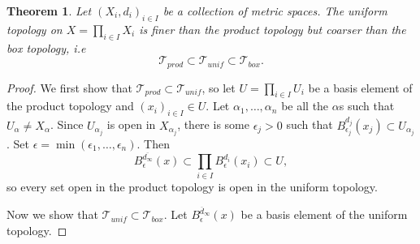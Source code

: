 \documentclass{report}
\newtheorem{theorem}{Theorem}[section]
\theoremstyle{definition}
\theoremstyle{remark}
\newcommand{\prt}[1]{\mathcal{#1}}
\newcommand{\ball}[3]{B_{#1}^{#3}(#2)}
\let\oldmin\min
\renewcommand{\min}[1]{\oldmin \left( #1 \right)}
\begin{document}
\begin{theorem} \label{thm_productUniformBoxCmp}
    Let $(X_i, d_i)_{i \in I}$ be a collection of metric spaces. The uniform topology on $X = \prod_{i \in I} X_i$ is finer than the product topology but coarser than the box topology, i.e
    \begin{equation*}
        \prt{T}_{prod} \subset \prt{T}_{unif} \subset \prt{T}_{box}.
    \end{equation*}
\end{theorem}

\begin{proof}
    We first show that $\prt{T}_{prod} \subset \prt{T}_{unif}$, so let $U=\prod_{i \in I} U_i$ be a basis element of the product topology and $(x_{i})_{i \in I} \in U$. Let $\alpha_1, \dots, \alpha_n$ be all the $\alpha$s such that $U_\alpha \neq X_\alpha$. Since $U_{\alpha_j}$ is open in $X_{\alpha_j}$, there is some $\epsilon_j > 0$ such that $B_{\epsilon_j}^{d_j}(x_j) \subset U_{\alpha_j}$. Set $\epsilon = \min{\epsilon_1, \dots, \epsilon_n}$. Then 
    \begin{equation*}
        B_{\epsilon}^{\overline{d_\infty}}(x) \subset \prod_{i \in I} B_{\epsilon}^{d_{i}}(x_i) \subset U,
    \end{equation*} so every set open in the product topology is open in the uniform topology.
    
    Now we show that $\prt{T}_{unif} \subset \prt{T}_{box}$. Let $\ball{\epsilon}{x}{\overline{d}_\infty}$ be a basis element of the uniform topology.
\end{proof}
\end{document}
